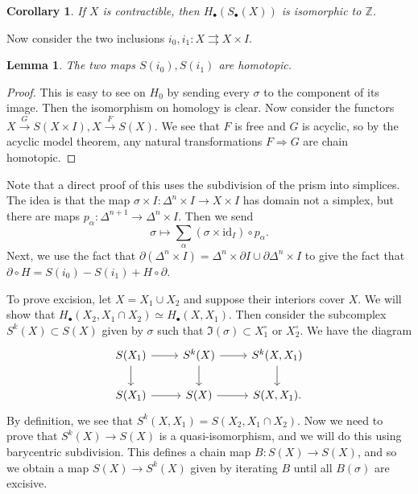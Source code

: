 \documentclass[leqno, openany]{memoir}
\newtheorem{cor}[thm]{Corollary}
\newtheorem{lem}[thm]{Lemma}
\theoremstyle{definition}
\theoremstyle{remark}
\theoremstyle{plain}
\theoremstyle{definition}
\theoremstyle{remark}
\newcommand{\Z}{\mathbb{Z}}
\newcommand{\mr}[1]{\mathrm{#1}}
\begin{document}
\begin{cor}
    If $X$ is contractible, then $H_{\bullet}(S_{\bullet}(X))$ is isomorphic to $\Z$.
\end{cor}

Now consider the two inclusions $i_0, i_1 \colon X \rightrightarrows X \times I$.

\begin{lem}
    The two maps $S(i_0), S(i_1)$ are homotopic.
\end{lem}

\begin{proof}
    This is easy to see on $H_0$ by sending every $\sigma$ to the component of its image. Then the isomorphism on homology is clear. Now consider the functors $X \xrightarrow{G} S(X \times I), X \xrightarrow{F} S(X)$. We see that $F$ is free and $G$ is acyclic, so by the acyclic model theorem, any natural transformations $F \Rightarrow G$ are chain homotopic.
\end{proof}

Note that a direct proof of this uses the subdivision of the prism into simplices. The idea is that the map $\sigma \times I \colon \Delta^n \times I \to X \times I$ has domain not a simplex, but there are maps $p_{\alpha} \colon \Delta^{n+1} \to \Delta^n \times I$. Then we send
\[ \sigma \mapsto \sum_{\alpha} (\sigma \times \mr{id}_I) \circ p_{\alpha}. \]
Next, we use the fact that $\partial(\Delta^n \times I) = \Delta^n \times \partial I \cup \partial \Delta^n \times I$ to give the fact that $\partial \circ H = S(i_0) - S(i_1) + H \circ \partial$.

To prove excision, let $X = X_1 \cup X_2$ and suppose their interiors cover $X$. We will show that $H_{\bullet}(X_2, X_1 \cap X_2) \simeq H_{\bullet}(X, X_1)$. Then consider the subcomplex $S^k(X) \subset S(X)$ given by $\sigma$ such that $\Im(\sigma) \subset X_1^{\circ}$ or $X_2^{\circ}$. We have
the diagram
\begin{equation*}
\begin{tikzcd}
    S(X_1) \arrow{d} \arrow{r} & S^k(X) \arrow{d} \arrow{r} & S^k(X, X_1) \arrow{d} \\
    S(X_1) \arrow{r} & S(X) \arrow{r} & S(X, X_1).
\end{tikzcd}
\end{equation*}
By definition, we see that $S^k(X, X_1) = S(X_2, X_1 \cap X_2)$. Now we need to prove that $S^k(X) \to S(X)$ is a quasi-isomorphism, and we will do this using barycentric subdivision. This defines a chain map $B \colon S(X) \to S(X)$, and so we obtain a map $S(X) \to S^k(X)$ given by iterating $B$ until all $B(\sigma)$ are excisive.
\end{document}

